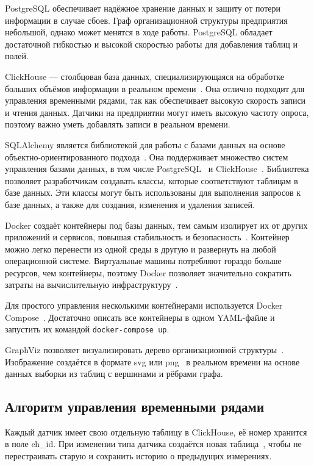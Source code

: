PostgreSQL обеспечивает надёжное хранение данных и защиту от потери информации в случае сбоев. Граф организационной структуры предприятия небольшой, однако может менятся в ходе работы. PostgreSQL обладает достаточной гибкостью и высокой скоростью работы для добавления таблиц и полей.

ClickHouse --- столбцовая база данных, специализирующаяся на обработке больших объёмов информации в реальном времени~\cite{clickhouse}. Она отлично подходит для управления временными рядами, так как обеспечивает высокую скорость записи и чтения данных. Датчики на предприятии могут иметь высокую частоту опроса, поэтому важно уметь добавлять записи в реальном времени.

SQLAlchemy является библиотекой для работы с базами данных на основе объектно-ориентированного подхода~\cite{SQLAlchemy}. Она поддерживает множество систем управления базами данных, в том числе PostgreSQL~\cite{SQLAlchemy-pg} и ClickHouse~\cite{SQLAlchemy-ch}. Библиотека позволяет разработчикам создавать классы, которые соответствуют таблицам в базе данных. Эти классы могут быть использованы для выполнения запросов к базе данных, а также для создания, изменения и удаления записей.

Docker создаёт контейнеры под базы данных, тем самым изолирует их от других приложений и сервисов, повышая стабильность и безопасность~\cite{Docker}. Контейнер можно легко перенести из одной среды в другую и развернуть на любой операционной системе. Виртуальные машины потребляют гораздо больше ресурсов, чем контейнеры, поэтому Docker позволяет значительно сократить затраты на вычислительную инфраструктуру~\cite{Habr-VM}.

Для простого управления несколькими контейнерами используется Docker Compose~\cite{Docker-Compose}. Достаточно описать все контейнеры в одном YAML-файле и запустить их командой \texttt{docker-compose up}.

GraphViz позволяет визуализировать дерево организационной структуры~\cite{Graphviz}. Изображение создаётся в формате svg или png~\cite{Graphviz-formats} в реальном времени на основе данных выборки из таблиц с вершинами и рёбрами графа.

\subsection{Алгоритм управления временными рядами}

Каждый датчик имеет свою отдельную таблицу в ClickHouse, её номер хранится в поле ch\_id. При изменении типа датчика создаётся новая таблица~\cite{ch-create-table,ch-data-types}, чтобы не перестраивать старую и сохранить историю о предыдущих измерениях.

